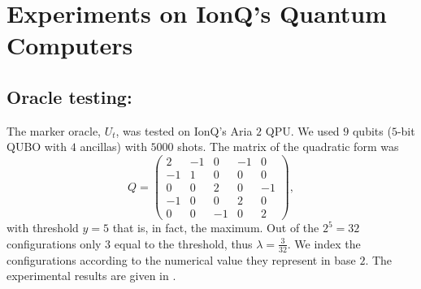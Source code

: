 \documentclass[reqno, 10pt]{amsart}
\numberwithin{equation}{section}                %
\begin{document}
\bigskip

\section{Experiments on IonQ's Quantum Computers}
\label{sec:experiments}

\subsection{Oracle testing:} The marker oracle, $U_t$, was tested on IonQ's Aria $2$ QPU. We used $9$ qubits ($5$-bit QUBO with $4$ ancillas) with $5000$ shots. The matrix of the quadratic form was
\begin{equation}
   Q = \begin{pmatrix}
         2 & - 1 & 0 & - 1 & 0 \\
         - 1 & 1 & 0 & 0 & 0 \\
         0 & 0 & 2 & 0 & - 1 \\
         - 1 & 0 & 0 & 2 & 0 \\
         0 & 0 & - 1 & 0 & 2
      \end{pmatrix},
\end{equation}
with threshold $y = 5$ that is, in fact, the maximum. Out of the $2^5 = 32$ configurations only $3$ equal to the threshold, thus $\lambda = \tfrac{3}{32}$. We index the configurations according to the numerical value they represent in base $2$. The experimental results are given in .
\end{document}
